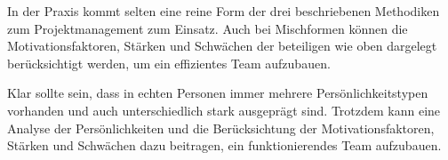 \documentclass[twocolumn,10pt]{asme2ej}
\begin{document}
In der Praxis kommt selten eine reine Form der drei beschriebenen Methodiken zum Projektmanagement zum Einsatz. Auch bei Mischformen  können die Motivationsfaktoren, Stärken und Schwächen der beteiligen wie oben dargelegt berücksichtigt werden, um ein effizientes Team aufzubauen.

Klar sollte sein, dass in echten Personen immer mehrere Persönlichkeitstypen vorhanden und auch unterschiedlich stark ausgeprägt sind. Trotzdem kann eine Analyse der Persönlichkeiten und die Berücksichtung der Motivationsfaktoren, Stärken und Schwächen dazu beitragen, ein funktionierendes Team aufzubauen.




\end{document}
